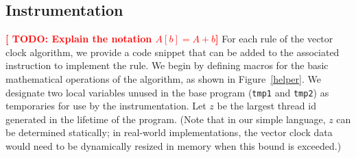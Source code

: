 \documentclass[preprint, 10pt]{sigplanconf}
\newcommand{\TODO}[1]{\textbf{\textcolor{red}{[ TODO: #1]}}}
\begin{document}
\subsection{Instrumentation}
\TODO{Explain the notation $A[b] = A + b$}
For each rule of the vector clock algorithm, we provide a code snippet that can be added to the associated instruction to implement the rule. We begin by defining macros for the basic mathematical operations of the algorithm, as shown in Figure~\ref{helper}. We designate two local variables unused in the base program (\texttt{tmp1} and \texttt{tmp2}) as temporaries for use by the instrumentation. Let $z$ be the largest thread id generated in the lifetime of the program. (Note that in our simple language, $z$ can be determined statically; in real-world implementations, the vector clock data would need to be dynamically resized in memory when this bound is exceeded.)
\end{document}
